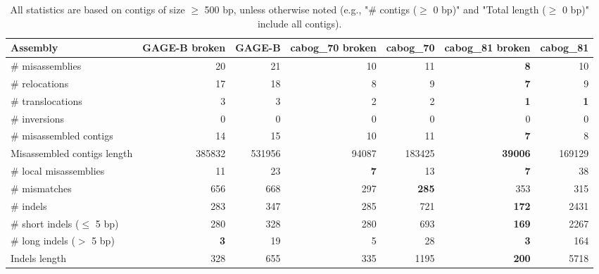 \documentclass[12pt,a4paper]{article}
\begin{document}
\begin{table}[ht]
\begin{center}
\caption{All statistics are based on contigs of size $\geq$ 500 bp, unless otherwise noted (e.g., "\# contigs ($\geq$ 0 bp)" and "Total length ($\geq$ 0 bp)" include all contigs).}
\begin{tabular}{|l*{6}{|r}|}
\hline
Assembly & GAGE-B broken & GAGE-B & cabog\_70 broken & cabog\_70 & cabog\_81 broken & cabog\_81 \\ \hline
\# misassemblies & 20 & 21 & 10 & 11 & {\bf 8} & 10 \\ \hline
\hspace{5mm}\# relocations & 17 & 18 & 8 & 9 & {\bf 7} & 9 \\ \hline
\hspace{5mm}\# translocations & 3 & 3 & 2 & 2 & {\bf 1} & {\bf 1} \\ \hline
\hspace{5mm}\# inversions & 0 & 0 & 0 & 0 & 0 & 0 \\ \hline
\# misassembled contigs & 14 & 15 & 10 & 11 & {\bf 7} & 8 \\ \hline
Misassembled contigs length & 385832 & 531956 & 94087 & 183425 & {\bf 39006} & 169129 \\ \hline
\# local misassemblies & 11 & 23 & {\bf 7} & 13 & {\bf 7} & 38 \\ \hline
\# mismatches & 656 & 668 & 297 & {\bf 285} & 353 & 315 \\ \hline
\# indels & 283 & 347 & 285 & 721 & {\bf 172} & 2431 \\ \hline
\hspace{5mm}\# short indels ($\leq$ 5 bp) & 280 & 328 & 280 & 693 & {\bf 169} & 2267 \\ \hline
\hspace{5mm}\# long indels ($>$ 5 bp) & {\bf 3} & 19 & 5 & 28 & {\bf 3} & 164 \\ \hline
Indels length & 328 & 655 & 335 & 1195 & {\bf 200} & 5718 \\ \hline
\end{tabular}
\end{center}
\end{table}
\end{document}
